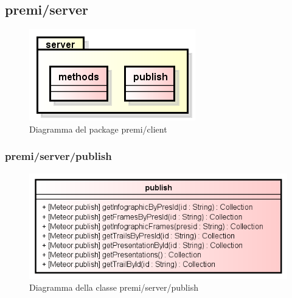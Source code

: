 \subsection{premi/server}
\begin{figure}[H]
\begin{center}
\includegraphics[scale=0.70]{img/diapkg/server.png}
\caption{Diagramma del package premi/client}
\end{center}
\end{figure}


\subsubsection{premi/server/publish}
\begin{figure}[H]
\begin{center}
\includegraphics[scale=0.55]{img/diacla/publish.png}
\caption{Diagramma della classe premi/server/publish}
\end{center}
\end{figure}




